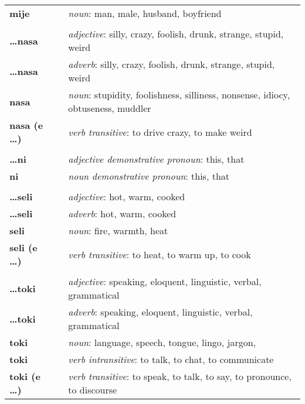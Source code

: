 \begin{supertabular}{p{2,5cm}|ll}
\textbf{mije} && \textit{noun}: man, male, husband, boyfriend \\ %
 && \\ %
\textbf{\dots nasa} && \textit{adjective}: silly, crazy, foolish, drunk, strange, stupid, weird \\ %
\textbf{\dots nasa} && \textit{adverb}: silly, crazy, foolish, drunk, strange, stupid, weird \\ %
\textbf{nasa} && \textit{noun}: stupidity, foolishness, silliness, nonsense, idiocy, obtuseness, muddler \\ %
\textbf{nasa (e \dots)} && \textit{verb transitive}: to drive crazy, to make weird \\ %
 && \\ %
\textbf{\dots ni} && \textit{adjective demonstrative pronoun}: this, that \\ %
\textbf{ni} && \textit{noun demonstrative pronoun}: this, that \\ %
 && \\ %
\textbf{\dots seli} && \textit{adjective}: hot, warm, cooked \\ %
\textbf{\dots seli} && \textit{adverb}: hot, warm, cooked \\ %
\textbf{seli} && \textit{noun}: fire, warmth, heat \\ %
\textbf{seli (e \dots)} && \textit{verb transitive}: to heat, to warm up, to cook \\ %
 && \\ %
\textbf{\dots toki} && \textit{adjective}: speaking, eloquent, linguistic, verbal, grammatical \\ %
\textbf{\dots toki} && \textit{adverb}: speaking, eloquent, linguistic, verbal, grammatical \\ %
\textbf{toki} && \textit{noun}: language, speech, tongue, lingo, jargon, \\ %
\textbf{toki} && \textit{verb intransitive}: to talk, to chat, to communicate \\ %
\textbf{toki (e \dots)} && \textit{verb transitive}: to speak, to talk, to say, to pronounce, to discourse \\ %
\end{supertabular} \\
% 
\newpage
{}
